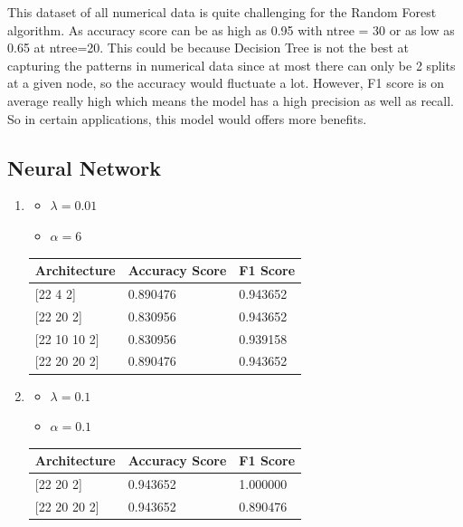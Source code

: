 \documentclass[letterpaper]{article}
\begin{document}
This dataset of all numerical data is quite challenging for the Random Forest algorithm. As accuracy score can be as high as 0.95 with ntree = 30
or as low as 0.65 at ntree=20. This could be because Decision Tree is not the best at capturing the patterns in numerical data since at most there
can only be 2 splits at a given node, so the accuracy would fluctuate a lot. However, F1 score is on average really high which means the model has
a high precision as well as recall. So in certain applications, this model would offers more benefits.

\subsection*{Neural Network}
\begin{enumerate}[label=(\alph*)]
	\item \begin{itemize}
		      \item $\lambda = 0.01$
		      \item $\alpha = 6$
	      \end{itemize}

	      \begin{table}[H]
		      \centering
		      \begin{tabular}{|l|l|l|}
			      \hline
			      Architecture     & Accuracy Score & F1 Score \\ \hline
			      {[}22 4 2{]}     & 0.890476       & 0.943652 \\ \hline
			      {[}22 20 2{]}    & 0.830956       & 0.943652 \\ \hline
			      {[}22 10 10 2{]} & 0.830956       & 0.939158 \\ \hline
			      {[}22 20 20 2{]} & 0.890476       & 0.943652 \\ \hline
		      \end{tabular}
	      \end{table}
	\item \begin{itemize}
		      \item $\lambda = 0.1$
		      \item $\alpha = 0.1$
	      \end{itemize}

	      \begin{table}[H]
		      \centering
		      \begin{tabular}{|l|l|l|}
			      \hline
			      Architecture     & Accuracy Score & F1 Score \\ \hline
			      {[}22 20 2{]}    & 0.943652       & 1.000000 \\ \hline
			      {[}22 20 20 2{]} & 0.943652       & 0.890476 \\ \hline
		      \end{tabular}
	      \end{table}
\end{enumerate}
\end{document}
